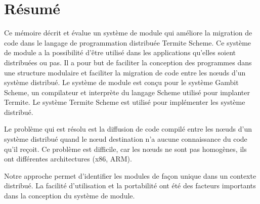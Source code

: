\documentclass[12pt,maitrise]{dms}
\theoremstyle{definition}
\numberwithin{equation}{section}
\numberwithin{table}{chapter}
\numberwithin{figure}{chapter}
\begin{document}


\maketitle

\maketitle

\chapter*{Résumé}
Ce mémoire décrit et évalue un système de module qui améliore la migration de
code dans le langage de programmation distribuée Termite Scheme. Ce système de
module a la possibilité d'être utilisé dans les applications qu'elles soient
distribuées ou pas.  Il a pour but de faciliter la conception des programmes
dans une structure modulaire et faciliter la migration de code entre les nœuds
d'un système distribué. Le système de module est conçu pour le système Gambit
Scheme, un compilateur et interprète du langage Scheme utilisé pour implanter
Termite. Le système Termite Scheme est utilisé pour implémenter les système
distribué.

Le problème qui est résolu est la diffusion de code compilé entre les nœuds
d'un système distribué quand le nœud destination n'a aucune connaissance du
code qu'il reçoit. Ce problème est difficile, car les nœuds ne sont pas
homogènes, ils ont différentes architectures (x86, ARM).

Notre approche permet d'identifier les modules
de façon unique dans un contexte distribué. La facilité
d'utilisation et la portabilité ont été des facteurs importants
dans la conception du système de module.
\end{document}
